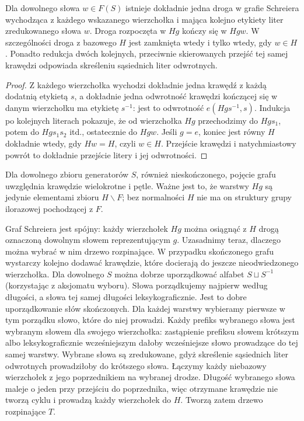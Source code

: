 \begin{lemat}
\label{aa:lem:schreier-path}
Dla dowolnego słowa $w\in F(S)$ istnieje dokładnie jedna droga
w grafie Schreiera wychodząca z każdego wskazanego wierzchołka
i mająca kolejno etykiety liter zredukowanego słowa $w$.
Droga rozpoczęta w $Hg$ kończy się w $Hgw$.
W szczególności droga z bazowego $H$ jest zamknięta wtedy
i tylko wtedy, gdy $w\in H$.
Ponadto redukcja dwóch kolejnych, przeciwnie skierowanych przejść
tej samej krawędzi odpowiada skreśleniu sąsiednich liter odwrotnych.
\end{lemat}
\begin{proof}
Z każdego wierzchołka wychodzi dokładnie jedna krawędź
z każdą dodatnią etykietą $s$, a dokładnie jedna odwrotność
krawędzi kończącej się w danym wierzchołku ma etykietę $s^{-1}$:
jest to odwrotność $e(Hgs^{-1},s)$.
Indukcja po kolejnych literach pokazuje, że od wierzchołka
$Hg$ przechodzimy do $Hgs_1$, potem do $Hgs_1s_2$ itd.,
ostatecznie do $Hgw$. Jeśli $g=e$, koniec jest równy $H$
dokładnie wtedy, gdy $Hw=H$, czyli $w\in H$.
Przejście krawędzi i natychmiastowy powrót to dokładnie
przejście litery i jej odwrotności.
\end{proof}

Dla dowolnego zbioru generatorów $S$, również nieskończonego,
pojęcie grafu uwzględnia krawędzie wielokrotne i pętle.
Ważne jest to, że warstwy $Hg$ są jedynie elementami zbioru
$H\backslash F$; bez normalności $H$ nie ma on struktury grupy
ilorazowej pochodzącej z $F$.

Graf Schreiera jest spójny: każdy wierzchołek $Hg$ można
osiągnąć z $H$ drogą oznaczoną dowolnym słowem reprezentującym $g$.
Uzasadnimy teraz, dlaczego można wybrać w nim drzewo rozpinające.
W przypadku skończonego grafu wystarczy kolejno dodawać krawędzie,
które docierają do jeszcze nieodwiedzonego wierzchołka.
Dla dowolnego $S$ można dobrze uporządkować alfabet
$S\sqcup S^{-1}$ (korzystając z aksjomatu wyboru).
Słowa porządkujemy najpierw według długości,
a słowa tej samej długości leksykograficznie.
Jest to dobre uporządkowanie słów skończonych. Dla każdej
warstwy wybieramy pierwsze w tym porządku słowo, które
do niej prowadzi. Każdy prefiks wybranego słowa jest wybranym
słowem dla swojego wierzchołka: zastąpienie prefiksu słowem
krótszym albo leksykograficznie wcześniejszym dałoby
wcześniejsze słowo prowadzące do tej samej warstwy.
Wybrane słowa są zredukowane, gdyż skreślenie sąsiednich
liter odwrotnych prowadziłoby do krótszego słowa.
Łączymy każdy niebazowy wierzchołek z jego poprzednikiem
na wybranej drodze. Długość wybranego słowa maleje o jeden
przy przejściu do poprzednika, więc otrzymane krawędzie
nie tworzą cyklu i prowadzą każdy wierzchołek do $H$.
Tworzą zatem drzewo rozpinające $T$.

